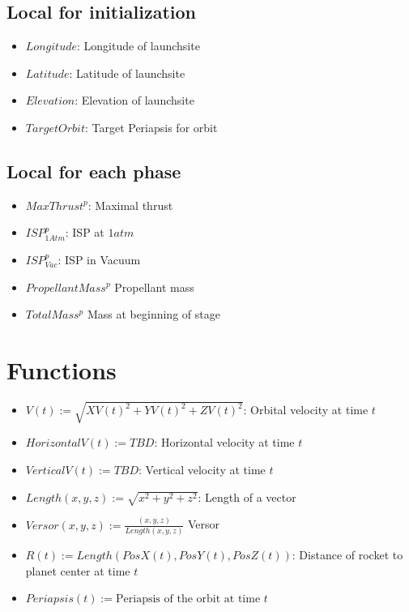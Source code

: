 \documentclass[11pt]{report}
\begin{document}
\subsection{Local for initialization}

\begin{itemize}
\item $Longitude$: Longitude of launchsite
\item $Latitude$: Latitude of launchsite
\item $Elevation$: Elevation of launchsite
\item $TargetOrbit$: Target Periapsis for orbit
\end{itemize}

\subsection{Local for each phase}

\begin{itemize}
\item $MaxThrust^p$: Maximal thrust
\item $ISP_{1Atm}^p$: ISP at $1 atm$
\item $ISP_{Vac}^p$: ISP in Vacuum
\item $PropellantMass^p$ Propellant mass
\item $TotalMass^p$ Mass at beginning of stage
\end{itemize}

\section{Functions}

\begin{itemize}
\item $V(t) := \sqrt{XV(t)^2 + YV(t)^2+ ZV(t)^2}$: Orbital velocity at time $t$
\item $HorizontalV(t) := TBD$: Horizontal velocity at time $t$
\item $VerticalV(t) := TBD$: Vertical velocity at time $t$
\item $Length(x, y, z) := \sqrt{x^2 + y^2 + z^2}$: Length of a vector
\item $Versor(x, y, z) := \frac{(x, y, z)}{Length(x, y, z)}$ Versor
\item $R(t) := Length(PosX(t), PosY(t), PosZ(t))$: Distance of rocket to planet center at time $t$
\item $Periapsis(t) := \textrm{Periapsis of the orbit at time } t$
\end{itemize}
\end{document}
